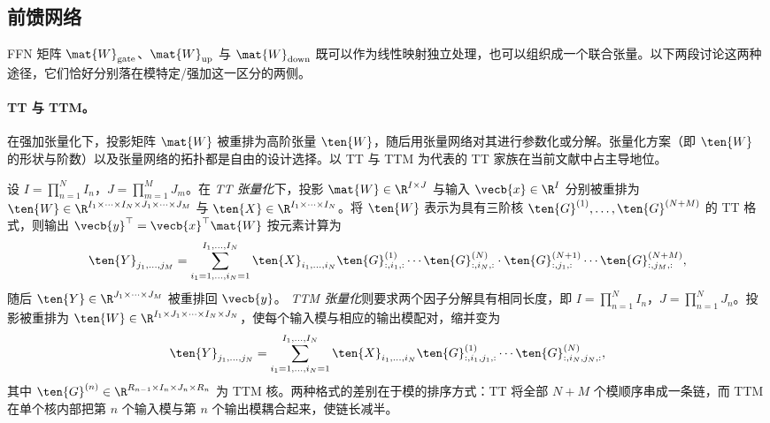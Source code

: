 \subsection{前馈网络}
\label{sec:component-ffn}

FFN 矩阵 $\mat{W}_{\rm gate}$、$\mat{W}_{\rm up}$ 与 $\mat{W}_{\rm down}$ 既可以作为线性映射独立处理，也可以组织成一个联合张量。以下两段讨论这两种途径，它们恰好分别落在模特定/强加这一区分的两侧。


\paragraph{TT 与 TTM。}

在强加张量化下，投影矩阵 $\mat{W}$ 被重排为高阶张量 $\ten{W}$，随后用张量网络对其进行参数化或分解。张量化方案（即 $\ten{W}$ 的形状与阶数）以及张量网络的拓扑都是自由的设计选择。以 TT 与 TTM 为代表的 TT 家族在当前文献中占主导地位。


设 $I = \prod_{n=1}^N I_n$，$J = \prod_{m=1}^M J_m$。在 \emph{TT 张量化}下，投影 $\mat{W} \in \R^{I \times J}$ 与输入 $\vecb{x} \in \R^{I}$ 分别被重排为 $\ten{W} \in \R^{I_1 \times \cdots \times I_N \times J_1 \times \cdots \times J_M}$ 与 $\ten{X} \in \R^{I_{1} \times \cdots \times I_{N}}$。将 $\ten{W}$ 表示为具有三阶核 $\ten{G}^{(1)}, \dots, \ten{G}^{(N+M)}$ 的 TT 格式，则输出 $\vecb{y}^\top = \vecb{x}^\top \mat{W}$ 按元素计算为
\begin{equation}
  \ten{Y}_{j_1, \dots, j_M} = \sum_{i_1=1, \dots, i_N=1}^{I_1, \dots, I_N} \ten{X}_{i_1, \dots, i_N} \ten{G}^{(1)}_{:, i_1, :} \cdots \ten{G}^{(N)}_{:, i_N, :} \cdot \ten{G}^{(N+1)}_{:, j_1, :} \cdots \ten{G}^{(N+M)}_{:, j_M, :},
\end{equation}
随后 $\ten{Y} \in \R^{J_1 \times \cdots \times J_M}$ 被重排回 $\vecb{y}$。
\emph{TTM 张量化}则要求两个因子分解具有相同长度，即 $I = \prod_{n=1}^N I_n$，$J = \prod_{n=1}^N J_n$。投影被重排为 $\ten{W} \in \R^{I_1 \times J_1 \times \cdots \times I_N \times J_N}$，使每个输入模与相应的输出模配对，缩并变为
\begin{equation}
  \ten{Y}_{j_1, \dots, j_N} = \sum_{i_1=1, \dots, i_N=1}^{I_1, \dots, I_N} \ten{X}_{i_1, \dots, i_N} \ten{G}^{(1)}_{:, i_1, j_1, :} \cdots \ten{G}^{(N)}_{:, i_N, j_N, :}, 
\end{equation}
其中 $\ten{G}^{(n)} \in \R^{R_{n-1} \times I_n \times J_n \times R_n}$ 为 TTM 核。两种格式的差别在于模的排序方式：TT 将全部 $N+M$ 个模顺序串成一条链，而 TTM 在单个核内部把第 $n$ 个输入模与第 $n$ 个输出模耦合起来，使链长减半。

